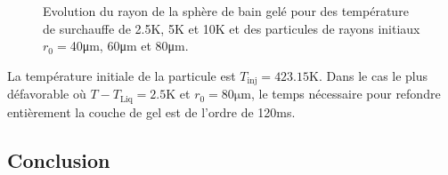 \begin{figure}
\begin{center}
  
  
  
  \caption{Evolution du rayon de la sphère de bain gelé pour des
    température de surchauffe de \num{2.5}\si{\kelvin},
    \num{5}\si{\kelvin} et \num{10}\si{\kelvin} et des particules de
    rayons initiaux $r_0 = $\num{40}\si{\micro\meter},
    \num{60}\si{\micro\meter} et \num{80}\si{\micro\meter}.}
  \label{fig:freeze-radius}
\end{center}
\end{figure}

La température initiale de la particule est $T_\text{inj} =
423.15\si{\kelvin}$.  Dans le cas le plus défavorable où $T -
T_\text{Liq} = 2.5\si{\kelvin}$ et $r_0 = 80\si{\micro\meter}$, le
temps nécessaire pour refondre entièrement la couche de gel est de
l'ordre de 120\si{\milli\second}.

\subsection*{Conclusion}
